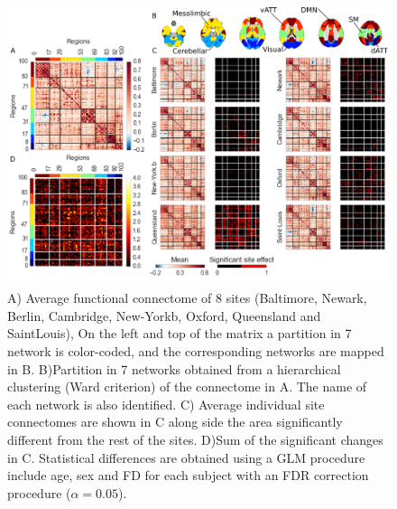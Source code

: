 \documentclass[authoryear]{elsarticle}
\begin{document}
\begin{figure}[tbp]
\begin{center}
\includegraphics[width=\linewidth]{../figures/connectome_multisite.png}
\end{center}
\caption[Connectome variability across sites]{
A) Average functional connectome of 8 sites (Baltimore, Newark, Berlin, Cambridge, New-Yorkb, Oxford, Queensland and SaintLouis), On the left and top of the matrix a partition in 7 network is color-coded, and the corresponding networks are mapped in B.
B)Partition in 7 networks obtained from a hierarchical clustering (Ward criterion) of the connectome in A. The name of each network is also identified.
C) Average individual site connectomes are shown in C along side the area significantly different from the rest of the sites.
D)Sum of the significant changes in C. Statistical differences are obtained using a GLM procedure include age, sex and FD for each subject with an FDR correction procedure ($\alpha=0.05$).
}
\label{fig_connectome_variability}
\end{figure}
\end{document}
